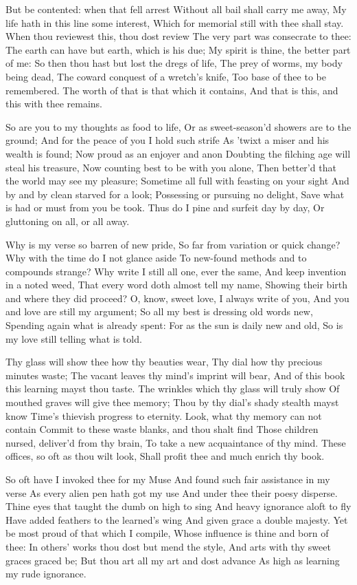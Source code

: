 \documentclass[twocolumn]{book}
\begin{document}
But be contented: when that fell arrest
Without all bail shall carry me away,
My life hath in this line some interest,
Which for memorial still with thee shall stay.
When thou reviewest this, thou dost review
The very part was consecrate to thee:
The earth can have but earth, which is his due;
My spirit is thine, the better part of me:
So then thou hast but lost the dregs of life,
The prey of worms, my body being dead,
The coward conquest of a wretch's knife,
Too base of thee to be remembered.
  The worth of that is that which it contains,
  And that is this, and this with thee remains.


So are you to my thoughts as food to life,
Or as sweet-season'd showers are to the ground;
And for the peace of you I hold such strife
As 'twixt a miser and his wealth is found;
Now proud as an enjoyer and anon
Doubting the filching age will steal his treasure,
Now counting best to be with you alone,
Then better'd that the world may see my pleasure;
Sometime all full with feasting on your sight
And by and by clean starved for a look;
Possessing or pursuing no delight,
Save what is had or must from you be took.
  Thus do I pine and surfeit day by day,
  Or gluttoning on all, or all away.


Why is my verse so barren of new pride,
So far from variation or quick change?
Why with the time do I not glance aside
To new-found methods and to compounds strange?
Why write I still all one, ever the same,
And keep invention in a noted weed,
That every word doth almost tell my name,
Showing their birth and where they did proceed?
O, know, sweet love, I always write of you,
And you and love are still my argument;
So all my best is dressing old words new,
Spending again what is already spent:
  For as the sun is daily new and old,
  So is my love still telling what is told.


Thy glass will show thee how thy beauties wear,
Thy dial how thy precious minutes waste;
The vacant leaves thy mind's imprint will bear,
And of this book this learning mayst thou taste.
The wrinkles which thy glass will truly show
Of mouthed graves will give thee memory;
Thou by thy dial's shady stealth mayst know
Time's thievish progress to eternity.
Look, what thy memory can not contain
Commit to these waste blanks, and thou shalt find
Those children nursed, deliver'd from thy brain,
To take a new acquaintance of thy mind.
  These offices, so oft as thou wilt look,
  Shall profit thee and much enrich thy book.


So oft have I invoked thee for my Muse
And found such fair assistance in my verse
As every alien pen hath got my use
And under thee their poesy disperse.
Thine eyes that taught the dumb on high to sing
And heavy ignorance aloft to fly
Have added feathers to the learned's wing
And given grace a double majesty.
Yet be most proud of that which I compile,
Whose influence is thine and born of thee:
In others' works thou dost but mend the style,
And arts with thy sweet graces graced be;
  But thou art all my art and dost advance
  As high as learning my rude ignorance.
\end{document}
